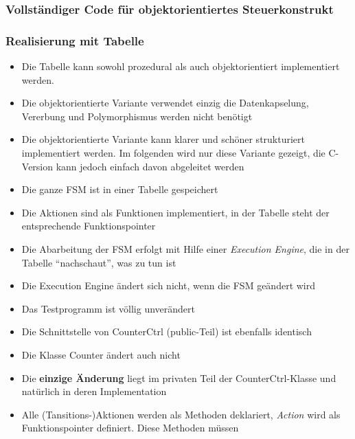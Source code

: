 \subsubsection{Vollständiger Code für objektorientiertes Steuerkonstrukt}






\subsubsection{Realisierung mit Tabelle}
\begin{itemize}
  \item Die Tabelle kann sowohl prozedural als auch objektorientiert implementiert werden.
  \item Die objektorientierte Variante verwendet einzig die Datenkapselung,
        Vererbung und Polymorphismus werden nicht benötigt
  \item Die objektorientierte Variante kann klarer und schöner strukturiert
        implementiert werden. Im folgenden wird nur diese Variante gezeigt, die
        C-Version kann jedoch einfach davon abgeleitet werden
  \item Die ganze FSM ist in einer Tabelle gespeichert
  \item Die Aktionen sind als Funktionen implementiert, in der Tabelle steht der
        entsprechende Funktionspointer
  \item Die Abarbeitung der FSM erfolgt mit Hilfe einer \textit{Execution
        Engine}, die in der Tabelle "`nachschaut"', was zu tun ist
  \item Die Execution Engine ändert sich nicht, wenn die FSM geändert wird
  \item Das Testprogramm ist völlig unverändert
  \item Die Schnittstelle von CounterCtrl (public-Teil) ist ebenfalls identisch
  \item Die Klasse Counter ändert auch nicht
  \item Die \textbf{einzige Änderung} liegt im privaten Teil der
        CounterCtrl-Klasse und natürlich in deren Implementation
  \item Alle (Tansitions-)Aktionen werden als Methoden deklariert,
  \textit{Action} wird als Funktionspointer definiert. Diese Methoden müssen

\end{itemize}
